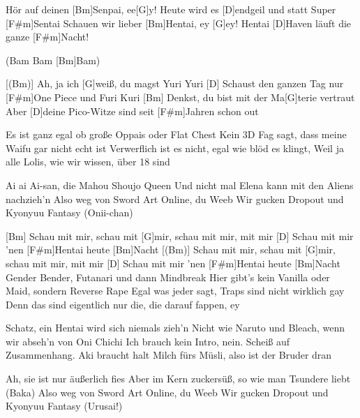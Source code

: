 

\begin{guitar}
	\begin{highlightbar}
		 
		Hör auf deinen [Bm]Senpai, ee[G]y!
		Heute wird es [D]endgeil und statt Super [F#m]Sentai
		Schauen wir lieber [Bm]Hentai, ey [G]ey!
		Hentai [D]Haven läuft die ganze [F#m]Nacht!
	\end{highlightbar}
	(Bam Bam [Bm]Bam)
	
	\songsection{Strophe 1}
	[(Bm)] Ah, ja ich [G]weiß, du magst Yuri Yuri
	[D] Schaust den ganzen Tag nur [F#m]One Piece und Furi Kuri
	[Bm] Denkst, du bist mit der Ma[G]terie vertraut
	Aber [D]deine Pico-Witze sind seit [F#m]Jahren schon out
	
	Es ist ganz egal ob große Oppais oder Flat Chest
	Kein 3D Fag sagt, dass meine Waifu gar nicht echt ist
	Verwerflich ist es nicht, egal wie blöd es klingt,
	Weil ja alle Lolis, wie wir wissen, über 18 sind
	
	Ai ai Ai-san, die Mahou Shoujo Queen
	Und nicht mal Elena kann mit den Aliens nachzieh'n
	Also weg von Sword Art Online, du Weeb
	Wir gucken Dropout und Kyonyuu Fantasy (Onii-chan)
	
	\begin{highlightbar}
		  \optionalChord{(x2)}
	\end{highlightbar}
	
	[Bm] Schau mit mir, schau mit [G]mir, schau mit mir, mit mir
	[D] Schau mit mir 'nen [F#m]Hentai heute [Bm]Nacht
	[(Bm)] Schau mit mir, schau mit [G]mir, schau mit mir, mit mir
	[D] Schau mit mir 'nen [F#m]Hentai heute [Bm]Nacht
	\pagebreak
	Gender Bender, Futanari und dann Mindbreak
	Hier gibt's kein Vanilla oder Maid, sondern Reverse Rape
	Egal was jeder sagt, Traps sind nicht wirklich gay
	Denn das sind eigentlich nur die, die darauf fappen, ey
	
	Schatz, ein Hentai wird sich niemals zieh'n
	Nicht wie Naruto und Bleach, wenn wir abseh'n von Oni Chichi
	Ich brauch kein Intro, nein. Scheiß auf Zusammenhang.
	Aki braucht halt Milch fürs Müsli, also ist der Bruder dran
	
	Ah, sie ist nur äußerlich fies
	Aber im Kern zuckersüß, so wie man Tsundere liebt (Baka)
	Also weg von Sword Art Online, du Weeb
	Wir gucken Dropout und Kyonyuu Fantasy (Urusai!)
	

\end{guitar}
